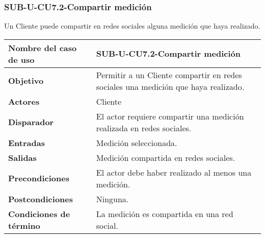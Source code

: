 \subsubsection{SUB-U-CU7.2-Compartir medición}\label{SUB-U-CU7.2}
Un Cliente puede compartir en redes sociales alguna medición que haya realizado.

\begin{longtable}{|J{5cm}|J{10.3cm}|}
	\hline
	\textbf{Nombre del caso de uso} &
		SUB-U-CU7.2-Compartir medición \\ \hline
	\textbf{Objetivo} &
		Permitir a un Cliente compartir en redes sociales una medición que haya realizado. \\ \hline
	\textbf{Actores} &
		Cliente \\ \hline 
	\textbf{Disparador} & 
		El actor requiere compartir una medición realizada en redes sociales. \\ \hline 
	\textbf{Entradas} & Medición seleccionada.
		\\ \hline 
	\textbf{Salidas} & Medición compartida en redes sociales.
		\\ \hline
	\textbf{Precondiciones} &
		El actor debe haber realizado al menos una medición.\\ \hline
	\textbf{Postcondiciones} & Ninguna.
		\\ \hline
	\textbf{Condiciones de término} & La medición es compartida en una red social.
		

\end{longtable}
